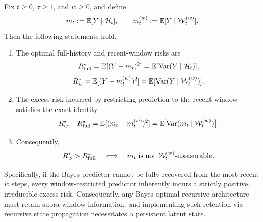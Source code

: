 \begin{theorem}
\label{thm:necessity_persistent_state}
Fix $t\ge 0$, $\tau\ge 1$, and $w\ge 0$, and define
\begin{equation}
m_t := \mathbb{E}[Y\mid \mathcal{H}_t],
\qquad
m_t^{(w)} := \mathbb{E}[Y\mid \mathcal{W}_t^{(w)}].
\label{eq:m_and_mw_def}
\end{equation}
Then the following statements hold.
\begin{enumerate}
    \item[\textup{(i)}] The optimal full-history and recent-window risks are
    \begin{equation}
    R_{\mathrm{full}}^\star
    =
    \mathbb{E}[(Y-m_t)^2]
    =
    \mathbb{E}[\operatorname{Var}(Y\mid \mathcal{H}_t)],
    \label{eq:Rfull_formula}
    \end{equation}
    \begin{equation}
    R_{w}^\star
    =
    \mathbb{E}[(Y-m_t^{(w)})^2]
    =
    \mathbb{E}[\operatorname{Var}(Y\mid \mathcal{W}_t^{(w)})].
    \label{eq:Rw_formula}
    \end{equation}

    \item[\textup{(ii)}] The excess risk incurred by restricting prediction to the recent window satisfies the exact identity
    \begin{equation}
    R_{w}^\star - R_{\mathrm{full}}^\star
    =
    \mathbb{E}[(m_t-m_t^{(w)})^2]
    =
    \mathbb{E}\!\bigl[\operatorname{Var}(m_t\mid \mathcal{W}_t^{(w)})\bigr].
    \label{eq:risk_gap_exact_identity}
    \end{equation}

    \item[\textup{(iii)}] Consequently,
    \begin{equation}
    R_{w}^\star > R_{\mathrm{full}}^\star
    \quad\Longleftrightarrow\quad
    m_t \text{ is not } \mathcal{W}_t^{(w)}\text{-measurable}.
    \label{eq:iff_nonmeasurable}
    \end{equation}
\end{enumerate}
Specifically, if the Bayes predictor cannot be fully recovered from the most recent $w$ steps, every window-restricted predictor inherently incurs a strictly positive, irreducible excess risk. Consequently, any Bayes-optimal recursive architecture must retain supra-window information, and implementing such retention via recursive state propagation necessitates a persistent latent state.
\end{theorem}

